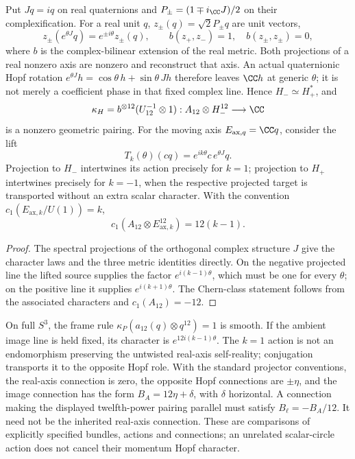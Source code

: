 \documentclass[11pt]{article}
\begin{document}
\begin{proposition}
\label{p1:prop:opposite-hopf-moving-axis}
Put \(Jq=iq\) on real quaternions and
\(P_\pm=(1\mp i_{\CC}J)/2\) on their complexification.
For a real unit \(q\), \(z_\pm(q)=\sqrt2P_\pm q\) are unit vectors,
\[
 z_\pm(e^{\theta J}q)=e^{\pm i\theta}z_\pm(q),\qquad
 b(z_+,z_-)=1,\quad b(z_\pm,z_\pm)=0,
\]
where \(b\) is the complex-bilinear extension of the real metric.
Both projections of a real nonzero axis are nonzero and reconstruct
that axis.  An actual quaternionic Hopf rotation
\(e^{\theta J}h=\cos\theta\,h+\sin\theta\,Jh\) therefore leaves
\(\CC h\) at generic \(\theta\); it is not merely a coefficient
phase in that fixed complex line.
Hence \(H_-\simeq H_+^*\), and
\[
 \kappa_H=b^{\otimes12}(U_{12}^{-1}\otimes1):
 A_{12}\otimes H_-^{12}\longrightarrow\CC
\]
is a nonzero geometric pairing.
For the moving axis \(E_{\mathrm{ax},q}=\CC q\), consider the lift
\[
 T_k(\theta)(cq)=e^{ik\theta}c\,e^{\theta J}q.
\]
Projection to \(H_-\) intertwines its action precisely for \(k=1\);
projection to \(H_+\) intertwines precisely for \(k=-1\), when the
respective projected target is transported without an extra scalar
character.  With the convention \(c_1(E_{\mathrm{ax},k}/U(1))=k\),
\[
 c_1(A_{12}\otimes E_{\mathrm{ax},k}^{12})=12(k-1).
\]
\end{proposition}
\begin{proof}
The spectral projections of the orthogonal complex structure \(J\)
give the character laws and the three metric identities directly.
On the negative projected line the lifted source supplies the factor
\(e^{i(k-1)\theta}\), which must be one for every \(\theta\); on the
positive line it supplies \(e^{i(k+1)\theta}\).
The Chern-class statement follows from the associated characters and
\(c_1(A_{12})=-12\).
\end{proof}

\begin{remark}
On full \(S^3\), the frame rule
\(\kappa_P(a_{12}(q)\otimes q^{12})=1\) is smooth.  If the ambient
image line is held fixed, its character is
\(e^{12i(k-1)\theta}\).  The \(k=1\) action is not an endomorphism
preserving the untwisted real-axis self-reality; conjugation transports
it to the opposite Hopf role.  With the standard projector conventions,
the real-axis connection is zero, the opposite Hopf connections are
\(\pm\eta\), and the image connection has the form
\(B_A=12\eta+\delta\), with \(\delta\) horizontal.  A connection making
the displayed twelfth-power pairing parallel must satisfy
\(B_\ell=-B_A/12\).  It need not be the inherited real-axis connection.
These are comparisons of explicitly specified bundles, actions and
connections; an unrelated scalar-circle action does not cancel their
momentum Hopf character.
\end{remark}
\end{document}
